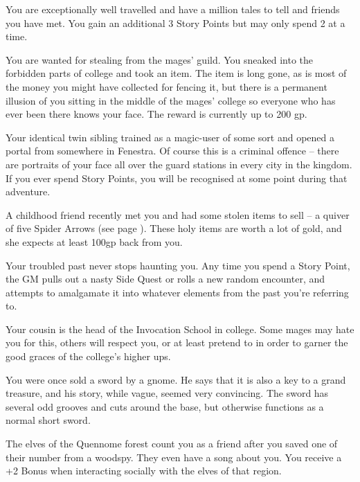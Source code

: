 \begin{multicols}{2}
\begin{list}{\addtocounter{list}{1}\textbf{:}}{\raggedleft}
	\item{You are exceptionally well travelled and have a million tales to tell and friends you have met.  You gain an additional 3 Story Points but may only spend 2 at a time. }

	\item{You are wanted for stealing from the mages' guild.
You sneaked into the forbidden parts of \gls{college} and took an item.
The item is long gone, as is most of the money you might have collected for fencing it, but there is a permanent illusion of you sitting in the middle of the mages' \gls{college} so everyone who has ever been there knows your face.
The reward is currently up to 200 gp.}

	\item{Your identical twin sibling trained as a magic-user of some sort and opened a portal from somewhere in Fenestra.
	Of course this is a criminal offence -- there are portraits of your face all over the guard stations in every city in the kingdom.
	If you ever spend Story Points, you will be recognised at some point during that adventure.}

	\item{A childhood friend recently met you and had some stolen items to sell -- a quiver of five Spider Arrows (see page \pageref{spiderarrows}).
These holy items are worth a lot of gold, and she expects at least 100gp back from you.}

	\item{Your troubled past never stops haunting you.
	Any time you spend a Story Point, the GM pulls out a nasty Side Quest or rolls a new random encounter, and attempts to amalgamate it into whatever elements from the past you're referring to.}

	\item{Your cousin is the head of the Invocation School in \gls{college}. Some mages may hate you for this, others will respect you, or at least pretend to in order to garner the good graces of the \gls{college}'s higher ups.}

	\item{You were once sold a sword by a gnome.  He says that it is also a key to a grand treasure, and his story, while vague, seemed very convincing.  The sword has several odd grooves and cuts around the base, but otherwise functions as a normal short sword. }

	\item{The elves of the Quennome forest count you as a friend after you saved one of their number from a woodspy.  They even have a song about you. You receive a +2 Bonus when interacting socially with the elves of that region.}


\end{list}
\end{multicols}
